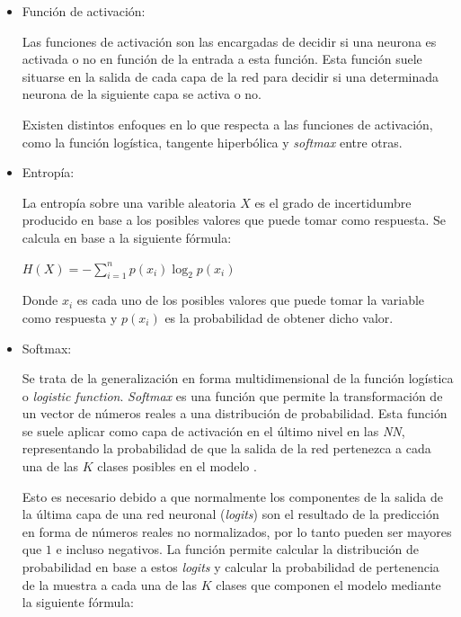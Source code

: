             \begin{itemize}

                \item Función de activación:

                    Las funciones de activación son las encargadas de decidir si una neurona es activada o no en función de la entrada a esta función. Esta función suele situarse en la salida de cada capa de la red para decidir si una determinada neurona de la siguiente capa se activa o no.

                    Existen distintos enfoques en lo que respecta a las funciones de activación, como la función logística, tangente hiperbólica y \textit{softmax} entre otras.


                \item Entropía:

                    La entropía sobre una varible aleatoria $X$ es el grado de incertidumbre producido en base a los posibles valores que puede tomar como respuesta. Se calcula en base a la siguiente fórmula:

                    \begin{center}
                        $H(X) = -\sum_{i = 1}^n p(x_i) \log_2 p(x_i)$
                    \end{center}

                    Donde $x_i$ es cada uno de los posibles valores que puede tomar la variable como respuesta y $p(x_i)$ es la probabilidad de obtener dicho valor. 


                \item Softmax:

                    Se trata de la generalización en forma multidimensional de la función logística o \textit{logistic function}. \textit{Softmax} es una función que permite la transformación de un vector de números reales a una distribución de probabilidad. Esta función se suele aplicar como capa de activación en el último nivel en las \textit{NN}, representando la probabilidad de que la salida de la red pertenezca a cada una de las $K$ clases posibles en el modelo \cite{Softmax}. 

                    Esto es necesario debido a que normalmente los componentes de la salida de la última capa de una red neuronal (\textit{logits}) son el resultado de la predicción en forma de números reales no normalizados, por lo tanto pueden ser mayores que $1$ e incluso negativos. La función permite calcular la distribución de probabilidad en base a estos \textit{logits} y calcular la probabilidad de pertenencia de la muestra a cada una de las $K$ clases que componen el modelo mediante la siguiente fórmula:



\end{itemize}

